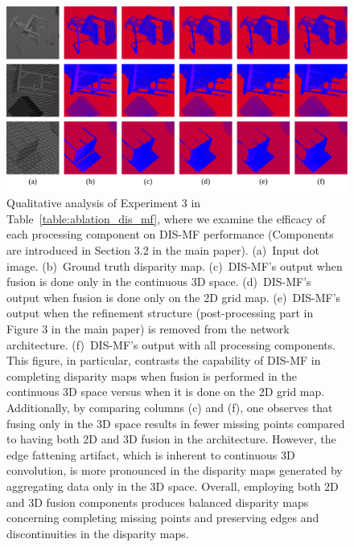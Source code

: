 \begin{figure}[t]
    \begin{center}
        \includegraphics[width=1.0\linewidth]{images/chapter2/supp_figures/ablation_mf_2d3d.jpg}
    \end{center}
   \caption{Qualitative analysis of Experiment 3 in Table~\ref{table:ablation_dis_mf}, where we examine the efficacy of each processing component on DIS-MF performance (Components are introduced in Section 3.2 in the main paper). (a)~Input dot image. (b)~Ground truth disparity map. (c)~DIS-MF's output when fusion is done only in the continuous 3D space. (d)~DIS-MF's output when fusion is done only on the 2D grid map. (e)~DIS-MF's output when the refinement structure (post-processing part in Figure 3 in the main paper) is removed from the network architecture. (f)~DIS-MF's output with all processing components. This figure, in particular, contrasts the capability of DIS-MF in completing disparity maps when fusion is performed in the continuous 3D space versus when it is done on the 2D grid map. Additionally, by comparing columns (c) and (f), one observes that fusing only in the 3D space results in fewer missing points compared to having both 2D and 3D fusion in the architecture. However, the edge fattening artifact, which is inherent to continuous 3D convolution, is more pronounced in the disparity maps generated by aggregating data only in the 3D space. Overall, employing both 2D and 3D fusion components produces balanced disparity maps concerning completing missing points and preserving edges and discontinuities in the disparity maps.}
    \label{fig:c2_ablation_mf_2d3d}
\end{figure}

